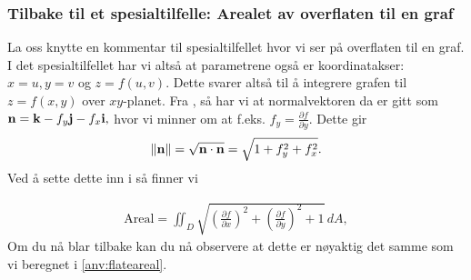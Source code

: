\subsubsection{Tilbake til et spesialtilfelle: Arealet av overflaten til en graf}
La oss knytte en kommentar til spesialtilfellet hvor vi ser på overflaten til en graf. I det spesialtilfellet har vi altså at parametrene også er koordinatakser: $x=u,y=v$ og  $z=f(u,v)$. Dette svarer altså til å integrere grafen til $z=f(x,y)$ over $xy$-planet. Fra , så har vi at normalvektoren da er gitt som
\(\mathbf{n}=\mathbf{k}-f_y\mathbf{j}-f_x\mathbf{i},\) hvor vi minner om at f.eks. $f_y=\frac{\partial f}{\partial y}$.
Dette gir 
\[ \|\mathbf{n}\|=\sqrt{\mathbf{n}\cdot\mathbf{n}}=\sqrt{1+f_y^2+f_x^2}.\] Ved å sette dette inn i  så finner vi

\begin{align}\label{old_area_formel}
\textrm{Areal}= \iint_D \sqrt{ \left( \frac{\partial f}{\partial x} \right)^2 + \left( \frac{\partial f}{\partial y} \right)^2 + 1 }\, dA,
\end{align}
Om du nå blar tilbake kan du nå observere at dette er nøyaktig det samme som vi beregnet i \eqref{anv:flateareal}.

